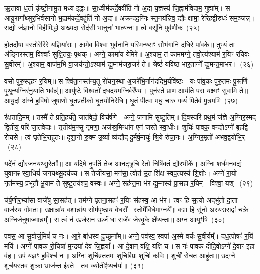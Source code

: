 ऋ॒तावा॑ ध॒र्ता कृ॑ष्टी॒नामु॒त मध्य॑ इ॒द्धः॥ सा॒ध्वीम॑कर्दे॒ववी॑तिं नो अ॒द्य य॒ज्ञस्य॑ जि॒ह्वाम॑विदाम॒ गुह्या᳚म्। स आयु॒रागा᳚थ्सुर॒\-भिर्वसा॑नो भ॒द्राम॑कर्दे॒वहू॑तिं नो अ॒द्य॥ अक्र॑न्दद॒ग्निः स्त॒नय॑न्निव॒ द्यौः क्षामा॒ रेरि॑हद्वी॒रुधः॑ सम॒ञ्जन्न्। स॒द्यो ज॑ज्ञा॒नो विहीमि॒द्धो अख्य॒दा रोद॑सी भा॒नुना॑ भात्य॒न्तः॥ त्वे वसू॑नि पुर्वणीक~(२५)\ip

होतर्दो॒षा वस्तो॒रेरि॑रे य॒ज्ञिया॑सः। क्षामे॑व॒ विश्वा॒ भुव॑नानि॒ यस्मि॒न्थ्सꣳ सौभ॑गानि दधि॒रे पा॑व॒के॥ तुभ्यं॒ ता अ॑ङ्गिरस्तम॒ विश्वाः᳚ सुक्षि॒तयः॒ पृथ॑क्। अग्ने॒ कामा॑य येमिरे॥ अ॒श्याम॒ तं काम॑मग्ने॒ तवो॒त्य॑श्याम॑ र॒यिꣳ र॑यिवः सु॒वीरम्᳚। अ॒श्याम॒ वाज॑म॒भि वा॒जय॑न्तो॒\-ऽश्याम॑ द्यु॒म्नम॑जरा॒जरं॑ ते॥ श्रेष्ठं॑ यविष्ठ भार॒ताग्ने᳚ द्यु॒मन्त॒माभ॑र।~(२६)\ip

वसो॑ पुरु॒स्पृहꣳ॑ र॒यिम्॥ स श्वि॑ता॒नस्त॑न्य॒तू रो॑चन॒स्था अ॒जरे॑भि॒र्नान॑दद्भि॒र्यवि॑ष्ठः। यः पा॑व॒कः पु॑रु॒तमः॑ पु॒रूणि॑ पृ॒थून्य॒ग्निर॑नु॒याति॒ भर्वन्न्॑॥ आयु॑ष्टे वि॒श्वतो॑ दधद॒यम॒ग्निर्वरे᳚ण्यः। पुन॑स्ते प्रा॒ण आय॑ति॒ परा॒ यक्ष्मꣳ॑ सुवामि ते॥ आ॒यु॒र्दा अ॑ग्ने ह॒विषो॑ जुषा॒णो घृ॒तप्र॑तीको घृ॒तयो॑निरेधि। घृ॒तं पी॒त्वा मधु॒ चारु॒ गव्यं॑ पि॒तेव॑ पु॒त्रम॒भि~(२७)\ip

र॑क्षतादि॒मम्॥ तस्मै॑ ते प्रति॒हर्य॑ते॒ जात॑वेदो॒ विच॑र्\mbox{}षणे। अग्ने॒ जना॑मि सुष्टु॒तिम्॥ दि॒वस्परि॑ प्रथ॒मं ज॑ज्ञे अ॒ग्निर॒स्मद् द्वि॒तीयं॒ परि॑ जा॒तवे॑दाः। तृ॒तीय॑म॒फ्सु नृ॒मणा॒ अज॑स्र॒मिन्धा॑न एनं जरते स्वा॒धीः॥ शुचिः॑ पावक॒ वन्द्यो\-ऽग्ने॑ बृ॒हद्वि रो॑चसे। त्वं घृ॒तेभि॒राहु॑तः॥ दृ॒शा॒नो रु॒क्म उ॒र्व्या व्य॑द्यौद् दु॒र्मर्\mbox{}ष॒मायुः॑ श्रि॒ये रु॑चा॒नः। अ॒ग्निर॒मृतो॑ अभव॒द्वयो॑भि॒र्-~(२८)\ip

यदे॑नं॒ द्यौरज॑नयथ्सु॒रेताः᳚॥ आ यदि॒षे नृ॒पतिं॒ तेज॒ आन॒ट्छुचि॒ रेतो॒ निषि॑क्तं॒ द्यौर॒भीके᳚। अ॒ग्निः शर्ध॑मनव॒द्यं युवा॑नꣴ स्वा॒धियं॑ जनयथ्सू॒दय॑च्च॥ स तेजी॑यसा॒ मन॑सा॒ त्वोत॑ उ॒त शि॑क्ष स्वप॒त्यस्य॑ शि॒क्षोः। अग्ने॑ रा॒यो नृत॑मस्य॒ प्रभू॑तौ भू॒याम॑ ते सुष्टु॒तय॑श्च॒ वस्वः॑॥ अग्ने॒ सह॑न्त॒मा भ॑र द्यु॒म्नस्य॑ प्रा॒सहा॑ र॒यिम्। विश्वा॒ यश्-~(२९)\ip

च॑र्\mbox{}ष॒णीर॒भ्या॑सा वाजे॑षु सा॒सह॑त्॥ तम॑ग्ने पृतना॒सहꣳ॑ र॒यिꣳ स॑हस्व॒ आ भ॑र। त्वꣳ हि स॒त्यो अद्भु॑तो दा॒ता वाज॑स्य॒ गोम॑तः॥ उ॒क्षान्ना॑य व॒शान्ना॑य॒ सोम॑पृष्ठाय वे॒धसे᳚। स्तोमै᳚र्विधेमा॒ग्नये᳚॥ व॒द्मा हि सू॑नो॒ अस्य॑द्म॒सद्वा॑ च॒क्रे अ॒ग्निर्ज॒नुषाज्मान्नम्᳚। स त्वं न॑ ऊर्जसन॒ ऊर्जं॑ धा॒ राजे॑व जेरवृ॒के क्षे᳚ष्य॒न्तः॥ अग्न॒ आयूꣳ॑षि~(३०)\ip

पवस॒ आ सु॒वोर्ज॒मिषं॑ च नः। आ॒रे बा॑धस्व दु॒च्छुना᳚म्॥ अग्ने॒ पव॑स्व॒ स्वपा॑ अ॒स्मे वर्चः॑ सु॒वीर्यम्᳚। दध॒त्पोषꣳ॑ र॒यिं मयि॑॥ अग्ने॑ पावक रो॒चिषा॑ म॒न्द्रया॑ देव जि॒ह्वया᳚। आ दे॒वान् व॑क्षि॒ यक्षि॑ च॥ स नः॑ पावक दीदि॒वो\-ऽग्ने॑ दे॒वाꣳ इ॒हा व॑ह। उप॑ य॒ज्ञꣳ ह॒विश्च॑ नः॥ अ॒ग्निः शुचि॑व्रततमः॒ शुचि॒र्विप्रः॒ शुचिः॑ क॒विः। शुची॑ रोचत॒ आहु॑तः॥ उद॑ग्ने॒ शुच॑य॒स्तव॑ शु॒क्रा भ्राज॑न्त ईरते। तव॒ ज्योतीꣴ॑ष्य॒र्चयः॑॥~(३१)\ip

